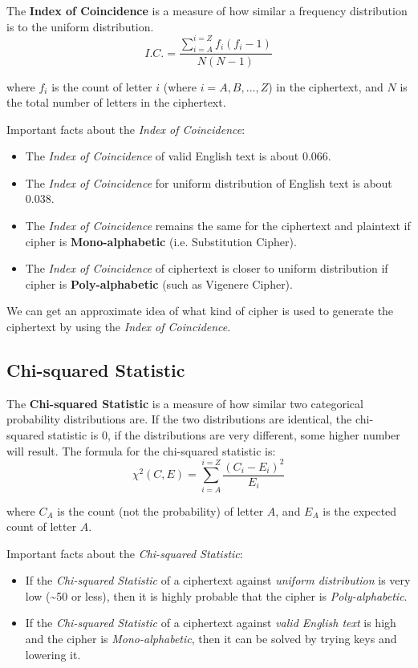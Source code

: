 \documentclass[10pt,twoside]{article}
\begin{document}
The \textbf{Index of Coincidence} is a measure of how similar a frequency distribution is to the uniform distribution.
$$ I.C. = \frac{\sum_{i=A}^{i=Z} f_i(f_i-1)}{N(N-1)}$$

where $f_i$ is the count of letter $i$ (where $i = A,B,...,Z$) in the ciphertext, and $N$ is the total number of letters in the ciphertext. \newline

Important facts about the \textit{Index of Coincidence}:
\begin{itemize}
  \setlength\itemsep{0em}
    \item The \textit{Index of Coincidence} of valid English text is about $0.066$.
    \item The \textit{Index of Coincidence} for uniform distribution of English text is about $0.038$.
    \item The \textit{Index of Coincidence} remains the same for the ciphertext and plaintext if cipher is \textbf{Mono-alphabetic} (i.e. Substitution Cipher).
    \item The \textit{Index of Coincidence} of ciphertext is closer to uniform distribution if cipher is \textbf{Poly-alphabetic} (such as Vigenere Cipher).
\end{itemize}

We can get an approximate idea of what kind of cipher is used to generate the ciphertext by using the \textit{Index of Coincidence}.

\subsection{Chi-squared Statistic} \label{chi}
The \textbf{Chi-squared Statistic} is a measure of how similar two categorical probability distributions are. If the two distributions are identical, the chi-squared statistic is 0, if the distributions are very different, some higher number will result. The formula for the chi-squared statistic is:
$$\chi^2(C,E) = \sum_{i=A}^{i=Z}\frac{(C_i-E_i)^2}{E_i}$$

where $C_A$ is the count (not the probability) of letter $A$, and $E_A$ is the expected count of letter $A$. \newline

Important facts about the \textit{Chi-squared Statistic}:
\begin{itemize}
  \setlength\itemsep{0em}
  \item If the \textit{Chi-squared Statistic} of a ciphertext against \textit{uniform distribution} is very low (\textasciitilde 50 or less), then it is highly probable that the cipher is \textit{Poly-alphabetic}.
  \item If the \textit{Chi-squared Statistic} of a ciphertext against \textit{valid English text} is high and the cipher is \textit{Mono-alphabetic}, then it can be solved by trying keys and lowering it.
\end{itemize}
\end{document}
